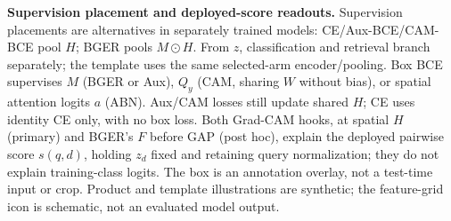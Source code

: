 \caption{\textbf{Supervision placement and deployed-score readouts.}
Supervision placements are alternatives in separately trained models:
CE/Aux-BCE/CAM-BCE pool $H$; BGER pools $M\odot H$.
From $z$, classification and retrieval branch separately; the template uses
the same selected-arm encoder/pooling. Box BCE supervises $M$ (BGER or Aux),
$Q_y$ (CAM, sharing $W$ without bias), or spatial attention logits $a$ (ABN).
Aux/CAM losses still update shared $H$; CE uses identity CE only, with no box loss.
Both Grad-CAM hooks, at spatial $H$ (primary) and BGER's $F$ before GAP
(post hoc), explain the deployed pairwise score $s(q,d)$, holding $z_d$ fixed
and retaining query normalization; they do not explain training-class logits.
The box is an annotation overlay, not a test-time input or crop.
Product and template illustrations are synthetic; the feature-grid icon is
schematic, not an evaluated model output.}

